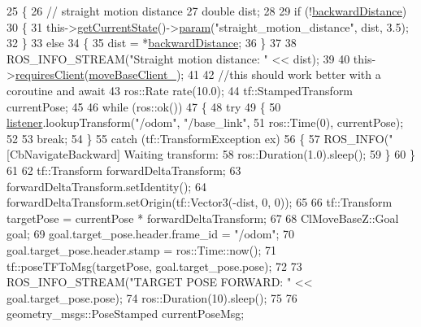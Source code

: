 \begin{DoxyCode}
25 \{
26     \textcolor{comment}{// straight motion distance}
27     \textcolor{keywordtype}{double} dist;
28 
29     \textcolor{keywordflow}{if} (!\hyperlink{classcl__move__base__z_1_1CbNavigateBackwards_abb7099e4e18602f6cf06c4f5534a2a15}{backwardDistance})
30     \{
31         this->\hyperlink{classsmacc_1_1SmaccClientBehavior_abf6773e4dd948f932f11a346dd6e7c2c}{getCurrentState}()->\hyperlink{classsmacc_1_1ISmaccState_a4982f2187ed6da337462721146e8ef70}{param}(\textcolor{stringliteral}{"straight\_motion\_distance"}, dist, 3.5);
32     \}
33     \textcolor{keywordflow}{else}
34     \{
35         dist = *\hyperlink{classcl__move__base__z_1_1CbNavigateBackwards_abb7099e4e18602f6cf06c4f5534a2a15}{backwardDistance};
36     \}
37 
38     ROS\_INFO\_STREAM(\textcolor{stringliteral}{"Straight motion distance: "} << dist);
39 
40     this->\hyperlink{classsmacc_1_1SmaccClientBehavior_a917f001e763a1059af337bf4e164f542}{requiresClient}(\hyperlink{classcl__move__base__z_1_1CbNavigateBackwards_a943c1a790eac9266adf11fbdc078f03a}{moveBaseClient\_});
41 
42     \textcolor{comment}{//this should work better with a coroutine and await}
43     ros::Rate rate(10.0);
44     tf::StampedTransform currentPose;
45 
46     \textcolor{keywordflow}{while} (ros::ok())
47     \{
48         \textcolor{keywordflow}{try}
49         \{
50             \hyperlink{classcl__move__base__z_1_1CbNavigateBackwards_a86be71ac1dd72f318875bee13259f3da}{listener}.lookupTransform(\textcolor{stringliteral}{"/odom"}, \textcolor{stringliteral}{"/base\_link"},
51                                      ros::Time(0), currentPose);
52 
53             \textcolor{keywordflow}{break};
54         \}
55         \textcolor{keywordflow}{catch} (tf::TransformException ex)
56         \{
57             ROS\_INFO(\textcolor{stringliteral}{"[CbNavigateBackward] Waiting transform: %
58             ros::Duration(1.0).sleep();
59         \}
60     \}
61 
62     tf::Transform forwardDeltaTransform;
63     forwardDeltaTransform.setIdentity();
64     forwardDeltaTransform.setOrigin(tf::Vector3(-dist, 0, 0));
65 
66     tf::Transform targetPose = currentPose * forwardDeltaTransform;
67 
68     ClMoveBaseZ::Goal goal;
69     goal.target\_pose.header.frame\_id = \textcolor{stringliteral}{"/odom"};
70     goal.target\_pose.header.stamp = ros::Time::now();
71     tf::poseTFToMsg(targetPose, goal.target\_pose.pose);
72 
73     ROS\_INFO\_STREAM(\textcolor{stringliteral}{"TARGET POSE FORWARD: "} << goal.target\_pose.pose);
74     ros::Duration(10).sleep();
75 
76     geometry\_msgs::PoseStamped currentPoseMsg;
}
\end{DoxyCode}
